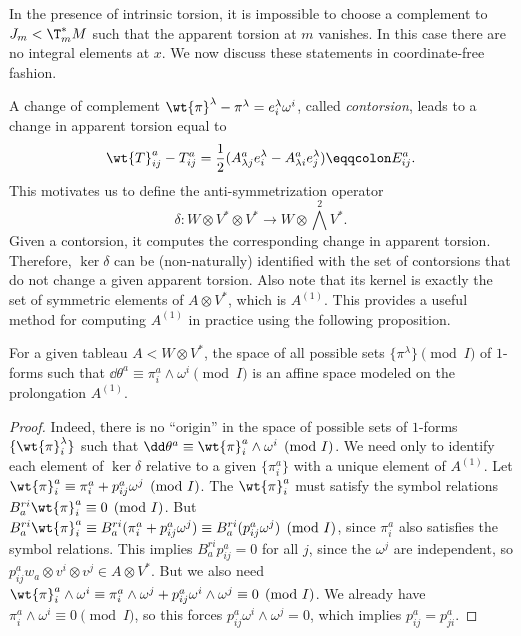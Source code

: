 In the presence of intrinsic torsion, it is impossible to choose a complement to $J_m<\T^\ast_mM$ such that the apparent torsion at $m$ vanishes. In this case there are no integral elements at $x$. We now discuss these statements in coordinate-free fashion.

A change of complement $\wt{\pi}^\lambda-\pi^\lambda=e^\lambda_i \omega^i$, called \emph{contorsion}, leads to a change in apparent torsion equal to
\[\wt{T}^a_{ij}-T^a_{ij}=\frac12(A^a_{\lambda j}e^\lambda_i-A^a_{\lambda i}e^\lambda_j)\eqqcolon E^a_{ij}.\]
This motivates us to define the anti-symmetrization operator
\[\delta:W\otimes V^\ast\otimes V^\ast\to W\otimes \bigwedge^2V^\ast.\]
Given a contorsion, it computes the corresponding change in apparent torsion. Therefore, $\ker\delta$ can be (non-naturally) identified with the set of contorsions that do not change a given apparent torsion. Also note that its kernel is exactly the set of symmetric elements of $A\otimes V^\ast$, which is $A^{(1)}$. This provides a useful method for computing $A^{(1)}$ in practice using the following proposition.

\begin{prop}\label{prop 6.7.1 Ivey}
    For a given tableau $A<W\otimes V^\ast$, the space of all possible sets $\{\pi^\lambda\}\pmod{I}$ of $1$-forms such that $\dd\theta^a\equiv \pi^a_i\wedge\omega^i\pmod{I}$ is an affine space modeled on the prolongation $A^{(1)}$.
\end{prop}
\begin{proof}
    Indeed, there is no ``origin'' in the space of possible sets of $1$-forms $\{\wt{\pi}_i^\lambda\}$ such that $\dd\theta^a\equiv\wt{\pi}^a_i\wedge \omega^i\pmod{I}$. We need only to identify each element of $\ker\delta$ relative to a given $\{\pi^a_i\}$ with a unique element of $A^{(1)}$. Let $\wt{\pi}^a_i\equiv\pi^a_i+p^a_{ij}\omega^j \pmod{I}$. The $\wt{\pi}^a_i$ must satisfy the symbol relations $B^{ri}_a\wt{\pi}^a_i\equiv 0\pmod{I}$. But $B^{ri}_a \wt{\pi}^a_i\equiv B^{ri}_a(\pi^a_i+p^a_{ij}\omega^j)\equiv B^{ri}_a(p^a_{ij}\omega^j)\pmod{I}$, since $\pi^a_i$ also satisfies the symbol relations. This implies $B^{ri}_ap^a_{ij}=0$ for all $j$, since the $\omega^j$ are independent, so $p^a_{ij}w_a\otimes v^i\otimes v^j\in A\otimes V^\ast$. But we also need $\wt{\pi}^a_i\wedge \omega^i\equiv \pi^a_i\wedge\omega^j+p^a_{ij}\omega^i\wedge\omega^j\equiv 0\pmod{I}$. We already have $\pi^a_i\wedge \omega^i\equiv 0\pmod{I}$, so this forces $p^a_{ij}\omega^i\wedge \omega^j=0$, which implies $p^a_{ij}=p^a_{ji}$.
\end{proof}

